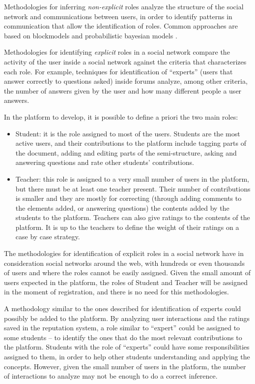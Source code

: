 Methodologies for inferring \textit{non-explicit} roles analyze the structure of the social network and communications between users, in order to identify patterns in communication that allow the identification of roles. Common approaches are based on blockmodels \cite{borgatti1993two,breiger1975algorithm} and probabilistic bayesian models \cite{steyvers2004probabilistic,mccallum2007topic,daud2009generalized}.

Methodologies for identifying \textit{explicit} roles in a social network compare the activity of the user inside a social network against the criteria that characterizes each role. For example, techniques for identification of ``experts'' (users that answer correctly to questions asked) inside forums \cite{zhang2007expertise} analyze, among other criteria, the number of answers given by the user and how many different people a user answers.

In the platform to develop, it is possible to define a priori the two main roles:
\begin{itemize}
\item Student: it is the role assigned to most of the users. Students are the most active users, and their contributions to the platform include tagging parts of the document, adding and editing parts of the semi-structure, asking and answering questions and rate other students' contributions.


\item Teacher: this role is assigned to a very small number of users in the platform, but there must be at least one teacher present. Their number of contributions is smaller and they are mostly for correcting (through adding comments to the elements added, or answering questions) the contents added by the students to the platform. Teachers can also give ratings to the contents of the platform. It is up to the teachers to define the weight of their ratings on a case by case strategy.
\end{itemize}

The methodologies for identification of explicit roles in a social network \cite{zhang2007expertise,agarwal2008identifying} have in consideration social networks around the web, with hundreds or even thousands of users and where the roles cannot be easily assigned. Given the small amount of users expected in the platform, the roles of Student and Teacher will be assigned in the moment of registration, and there is no need for this methodologies. 

A methodology similar to the ones described for identification of experts \cite{zhang2007expertise} could possibly be added to the platform. By analyzing user interactions and the ratings saved in the reputation system, a role similar to ``expert'' could be assigned to some students – to identify the ones that do the most relevant contributions to the platform. Students with the role of ``experts'' could have some responsibilities assigned to them, in order to help other students understanding and applying the concepts. However, given the small number of users in the platform, the number of interactions to analyze may not be enough to do a correct inference.


